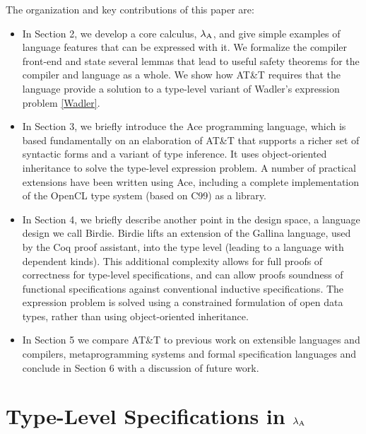\documentclass[10pt]{sigplanconf}
\begin{document}
The organization and key contributions of this paper are:
\begin{itemize}
\item In Section 2, we develop a core calculus, $\lambda_{\text{A}}$, and give simple examples of language features that can be expressed with it. We formalize the compiler front-end and state several lemmas that lead to useful safety theorems for the compiler and language as a whole.  We show how AT\&T requires that the language provide a solution to a type-level variant of Wadler's expression problem \ref{Wadler}. 
\item In Section 3, we briefly introduce the Ace programming language, which is based fundamentally on an  elaboration of AT\&T that supports a richer set of syntactic forms and a variant of type inference. It uses object-oriented inheritance to solve the type-level expression problem. A number of practical extensions have been written using Ace, including a complete implementation of the OpenCL type system (based on C99) as a library.
\item In Section 4, we briefly describe another point in the design space, a language design we call Birdie. Birdie lifts an extension of the Gallina language, used by the Coq proof assistant, into the type level (leading to a language with dependent kinds). This additional complexity allows for full proofs of correctness for type-level specifications, and can allow proofs soundness of functional specifications against conventional inductive specifications. The expression problem is solved using a constrained formulation of open data types, rather than using object-oriented inheritance. 
\item In Section 5 we compare AT\&T to previous work on extensible languages and compilers, metaprogramming systems and formal specification languages and conclude in Section 6 with a discussion of future work.
\end{itemize}

\section{Type-Level Specifications in $\lambda_{\text{A}}$}
\end{document}
